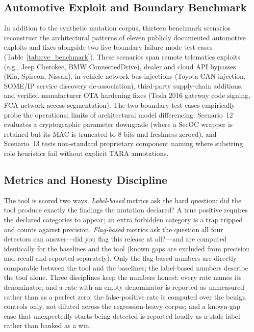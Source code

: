 \documentclass[journal]{IEEEtran}
\begin{document}
\subsection{Automotive Exploit and Boundary Benchmark}
In addition to the synthetic mutation corpus, thirteen benchmark scenarios reconstruct the architectural patterns of eleven publicly documented automotive exploits and fixes alongside two live boundary failure mode test cases (Table~\ref{tab:cve_benchmark}). These scenarios span remote telematics exploits (e.g., Jeep Cherokee, BMW ConnectedDrive), dealer and cloud API bypasses (Kia, Spireon, Nissan), in-vehicle network bus injections (Toyota CAN injection, SOME/IP service discovery de-association), third-party supply-chain additions, and verified manufacturer OTA hardening fixes (Tesla 2016 gateway code signing, FCA network access segmentation). The two boundary test cases empirically probe the operational limits of architectural model differencing: Scenario~12 evaluates a cryptographic parameter downgrade (where a SecOC wrapper is retained but its MAC is truncated to 8 bits and freshness zeroed), and Scenario~13 tests non-standard proprietary component naming where substring role heuristics fail without explicit TARA annotations.

\subsection{Metrics and Honesty Discipline}
The tool is scored two ways. \emph{Label-based} metrics ask the hard question:
did the tool produce exactly the findings the mutation declared? A true positive
requires the declared categories to appear; an extra forbidden category is a
trap tripped and counts against precision. \emph{Flag-based} metrics ask the
question all four detectors can answer---did you flag this release at all?---and
are computed identically for the baselines and the tool (known gaps are excluded
from precision and recall and reported separately). Only the flag-based numbers
are directly comparable between the tool and the baselines; the label-based
numbers describe the tool alone. Three disciplines keep the numbers honest:
every rate names its denominator, and a rate with an empty denominator is
reported as unmeasured rather than as a perfect zero; the false-positive rate is
computed over the benign controls only, not diluted across the regression-heavy
corpus; and a known-gap case that unexpectedly starts being detected is reported
loudly as a stale label rather than banked as a win.
\end{document}
